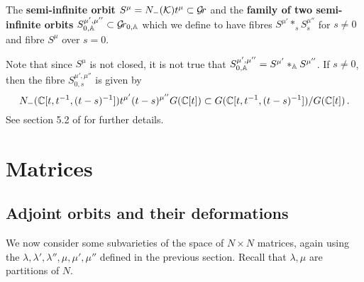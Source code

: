 \documentclass{article} %
\begin{document}
% 
% 
\begin{definition} 
\label{def:inftyorbits}
    The \textbf{semi-infinite orbit} $ S^\mu = N_-(\cK)t^\mu \subset \Gr $ and the \textbf{family of two semi-infinite orbits} 
 $S^{\mu', \mu''}_{0,\AA} \subset \Grbd$
 which we define to have fibres $ S^{\mu'} \ast_s S^{\mu''}_s $ for $ s \ne 0$ and fibre $ S^{\mu}$ over $ s = 0 $.
\end{definition}
Note that since $ S^{\mu}$ is not closed, it is not true that $S^{\mu', \mu''}_{0,\AA} = S^{\mu'} \ast_\AA S^{\mu''}$.
% 
% 
If $ s \ne 0 $, then the fibre $S^{\mu', \mu''}_{0,s} $ is given by
$$
    N_-(\CC[t, t^{-1}, (t-s)^{-1}])t^{\mu'} (t-s)^{\mu''} G(\CC[t])\subset G(\CC[t,t^{-1}, (t-s)^{-1}]) / G(\CC[t]) \,. %
$$
See section 5.2 of \cite{baumann2020bases} for further details.

% 


\section{Matrices}
\label{s:mats}
% 
\subsection{Adjoint orbits and their deformations}
\label{ss:familiesofadjointorbits}
% 
We now consider some subvarieties of the space of $ N\times N$ matrices, again using the $ \lambda, \lambda', \lambda'', \mu, \mu', \mu''$ defined in the previous section.  Recall that $\lambda, \mu $ are partitions of $ N$.
\end{document}
